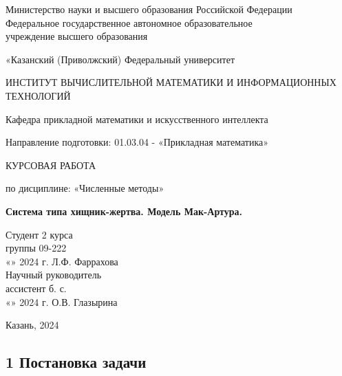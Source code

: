 \documentclass[a4paper,14pt]{extreport}
\begin{document}
	\renewcommand\contentsname{Содержание}
	\renewcommand{\arraystretch}{1.3} 
	\thispagestyle{empty}
	\begin{center}
		Министерство науки и высшего образования Российской Федерации\\
        Федеральное государственное автономное образовательное\\
        учреждение высшего образования
		\vspace{0.1cm}
		
		«Казанский (Приволжский)  Федеральный университет
		\vspace{1cm}
		
		ИНСТИТУТ ВЫЧИСЛИТЕЛЬНОЙ МАТЕМАТИКИ И ИНФОРМАЦИОННЫХ ТЕХНОЛОГИЙ
		
		Кафедра прикладной математики и искусственного интеллекта

		\vspace{1cm}

		Направление подготовки: 01.03.04 - «Прикладная математика»
	\end{center}
	\vspace{1cm}
	
	\begin{center}
		КУРСОВАЯ РАБОТА
		\vspace{0.2cm}
		
		по дисциплине: «Численные методы»
		\vspace{0.2cm}
		
		\textbf{Система типа хищник-жертва. Модель Мак-Артура.}
	\end{center}
	\vspace{3cm}
	Студент 2 курса\\
	группы 09-222\\
	«\underline{\qquad}» \underline{\qquad\qquad} 2024 г. \qquad\qquad\quad \underline{\qquad\qquad\qquad\quad} \qquad Л.Ф. 	Фаррахова\\
	Научный руководитель\\
	ассистент б. с.\\
	«\underline{\qquad}» \underline{\qquad\qquad} 2024 г. \qquad\qquad\quad \underline{\qquad\qquad\qquad\quad} \qquad О.В. 	Глазырина
	\vspace{2cm}
	
	\begin{center}
		Казань, 2024
	\end{center}
	\newpage
	
	\setcounter{page}{2}
	\tableofcontents
	\newpage
	
	\begin{center}
		\section*{1 Постановка задачи}
	\end{center}
\end{document}
